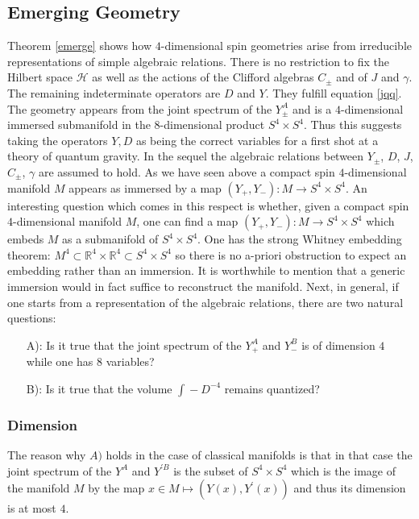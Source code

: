 \documentclass[12pt]{article}
\def\R{{\mathbb R}}
\def\cH{{\mathcal H}}
\begin{document}
\subsection{Emerging Geometry}\label{emerging geom}
 Theorem \ref{emerge} shows how $4$-dimensional spin geometries arise from irreducible representations of simple algebraic relations. There is no restriction to fix the Hilbert space $\cH$ as well as the actions of the Clifford algebras $C_\pm$ and of $J$ and $\gamma$. The remaining indeterminate
 operators  are $D$ and $Y$. They fulfill equation \eqref{jqq}. The geometry appears from the joint spectrum of the $Y^A_\pm$ and is a $4$-dimensional immersed submanifold in the $8$-dimensional product $S^4\times S^4$. 
Thus this suggests taking the
operators $Y, D$  as being the correct variables for a first shot
at a theory of quantum gravity. 
In the sequel the algebraic relations between $Y_{\pm}$, $D$, $J$,
$C_{\pm}$, $\gamma$ are assumed to hold.
As we have seen above  a compact spin $4$-dimensional manifold $M$ appears as immersed by  a map
$(Y_+,Y_-):M \to S^{4}\times S^{4}$.
 An interesting question which comes in this
respect is whether, given a compact spin $4$-dimensional manifold $M$, one can find a map
$(Y_+,Y_-):M \to S^{4}\times S^{4}$ which embeds $M$ as a submanifold of
$S^{4}\times S^{4}$. One has the 
strong Whitney embedding theorem: $M^4\subset \R^4\times \R^4\subset S^4\times S^4$
so there is no a-priori obstruction to expect an embedding rather than an immersion.
It is worthwhile to mention that a generic immersion would in fact suffice to reconstruct the manifold.  Next, in general, if one starts from a representation of the algebraic relations, there are two  natural questions:
\begin{enumerate}
\item[A):] Is it true that the joint spectrum of the $Y_+^{A}$ and $Y_-^{
B}$ is of dimension $4$ while one has $8$ variables?

\item[B):] Is it true that the volume
$
{\int\!\!\!\!\!\! -} D^{-4}
$
remains quantized?
\end{enumerate}
\subsubsection{Dimension}
The reason why $A)$ holds in the case of classical manifolds is that in that
case the joint spectrum of the $Y^{A}$ and $Y^{\prime B}$ is the subset of
$S^{4}\times S^{4}$ which is the image of the manifold $M$ by the map $x\in
M\mapsto(Y(x),Y^{\prime}(x))$ and thus its dimension is at most $4$.
\end{document}
